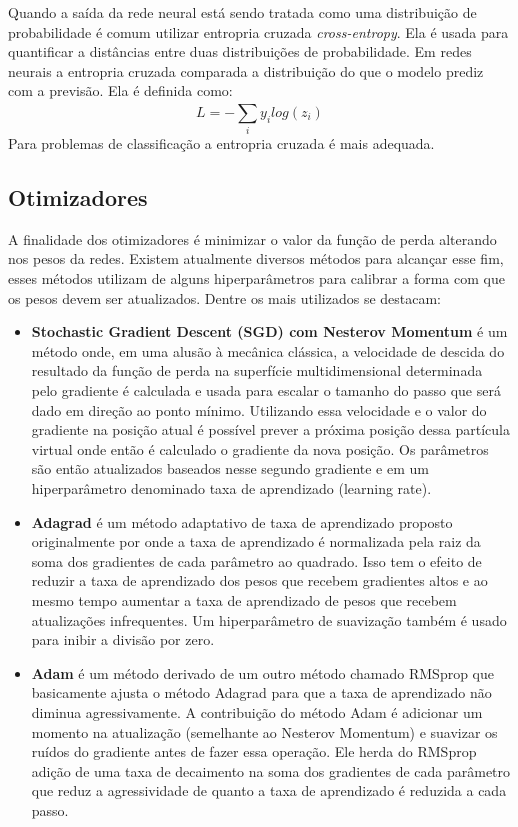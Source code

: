 Quando a saída da rede neural está sendo tratada como uma distribuição de probabilidade é comum utilizar entropria cruzada \textit{cross-entropy}. Ela é usada para quantificar a distâncias entre duas distribuições de probabilidade. Em redes neurais a entropria cruzada comparada a distribuição do que o modelo prediz com a previsão. Ela é definida como:
\begin{equation}
L = - \sum_{i}^{} y_i log(z_i)
\end{equation}
Para problemas de classificação a entropria cruzada é mais adequada.


\subsection{Otimizadores} \label{ssec:otimizadores}
A finalidade dos otimizadores é minimizar o valor da função de perda alterando nos pesos da redes. Existem atualmente diversos métodos para alcançar esse fim, esses métodos utilizam de alguns hiperparâmetros para calibrar a forma com que os pesos devem ser atualizados. Dentre os mais utilizados se destacam:
\begin{itemize}
	\item \textbf{ Stochastic Gradient Descent (SGD) com Nesterov Momentum} é um método onde, em uma alusão à mecânica clássica, a velocidade de descida do resultado da função de perda na superfície multidimensional determinada pelo gradiente é calculada e usada para escalar o tamanho do passo que será dado em direção ao ponto mínimo. Utilizando essa velocidade e o valor do gradiente na posição atual é possível prever a próxima posição dessa partícula virtual onde então é calculado o gradiente da nova posição. Os parâmetros são então atualizados baseados nesse segundo gradiente e em um hiperparâmetro denominado taxa de aprendizado (learning rate). \cite{bengio2012}
	\item \textbf{Adagrad} é um método adaptativo de taxa de aprendizado proposto originalmente por \cite{adagrad2011} onde a taxa de aprendizado é normalizada pela raiz da soma dos gradientes de cada parâmetro ao quadrado. Isso tem o efeito de reduzir a taxa de aprendizado dos pesos que recebem gradientes altos e ao mesmo tempo aumentar a taxa de aprendizado de pesos que recebem atualizações infrequentes. Um hiperparâmetro de suavização também é usado para inibir a divisão por zero.
	\item \textbf{Adam} é um método derivado de um outro método chamado RMSprop que basicamente ajusta o método Adagrad para que a taxa de aprendizado não diminua agressivamente. A contribuição do método Adam é adicionar um momento na atualização (semelhante ao Nesterov Momentum) e suavizar os ruídos do gradiente antes de fazer essa operação. Ele herda do RMSprop  adição de uma taxa de decaimento na soma dos gradientes de cada parâmetro que reduz a agressividade de quanto a taxa de aprendizado é reduzida a cada passo. \cite{adam2014}
\end{itemize}

